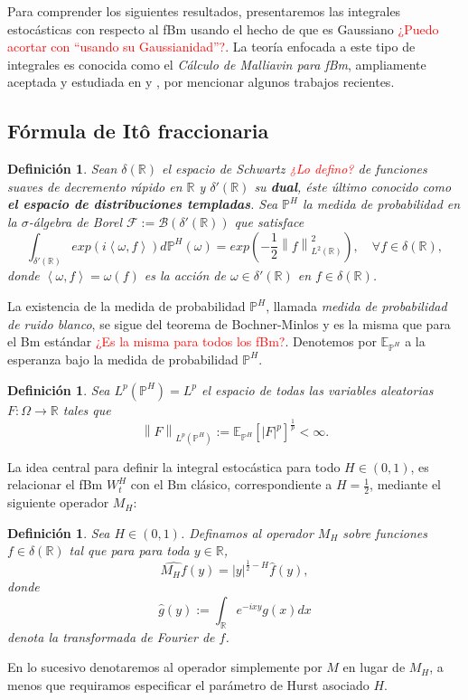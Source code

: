 \documentclass[letterpaper,12pt,oneside]{book}
\theoremstyle{plain}
\newtheorem{dfn}[theorem]{Definición}
\numberwithin{theorem}{section}
\begin{document}
Para comprender los siguientes resultados, presentaremos las integrales estocásticas con respecto al fBm usando el hecho de que es Gaussiano \textcolor{red}{¿Puedo acortar con ``usando su Gaussianidad''?}. La teoría enfocada a este tipo de integrales es conocida como el \textsl{Cálculo de Malliavin para fBm}, ampliamente aceptada y estudiada en \cite{yilmaz_computation_2018} y \cite{di_nunno_malliavin_2009}, por mencionar algunos trabajos recientes.
\subsection{Fórmula de Itô fraccionaria}
\begin{dfn}\label{dfn:1.3.1}
	Sean $\delta(\mathbb R)$ el espacio de Schwartz \textcolor{red}{¿Lo defino?} de funciones suaves de decremento rápido en $\mathbb R$ y $\delta'(\mathbb R)$ su \textbf{dual}, éste último conocido como \textbf{el espacio de distribuciones templadas}. Sea $\mathbb P^H$ la medida de probabilidad en la $\sigma$-álgebra de Borel $\mathcal F:=\mathcal B(\delta'(\mathbb R))$ que satisface
	$$\int_{\delta'(\mathbb R)}exp\left(i\left<\omega,f\right>\right)d\mathbb P^H(\omega)=exp\left(-\frac{1}{2}\left\|f\right\|^2_{L^2(\mathbb R)}\right),\quad \forall f\in\delta(\mathbb R),$$
	donde $\left<\omega,f\right>=\omega(f)$ es la acción de $\omega\in\delta'(\mathbb R)$ en $f\in \delta(\mathbb R)$.
\end{dfn}
La existencia de la medida de probabilidad $\mathbb P^H$, llamada \textsl{medida de probabilidad de ruido blanco}, se sigue del teorema de Bochner-Minlos y es la misma que para el Bm estándar \textcolor{red}{¿Es la misma para todos los fBm?}. Denotemos por $\mathbb E_{\mathbb P^H}$ a la esperanza bajo la medida de probabilidad $\mathbb P^H$.
\begin{dfn}
Sea $L^p(\mathbb P^H)=L^p$ el espacio de todas las variables aleatorias $F:\Omega\rightarrow \mathbb R$ tales que
$$\left\|F\right\|_{L^p(\mathbb P^H)}:=\mathbb E_{\mathbb P^H}\left[\left|F\right|^p\right]^{\frac{1}{p}}<\infty.$$
\end{dfn}
La idea central para definir la integral estocástica para todo $H\in(0,1)$, es relacionar el fBm $W^H_t$ con el Bm clásico, correspondiente a $H=\frac{1}{2}$, mediante el siguiente operador $M_H$:
\begin{dfn}
	Sea $H\in(0,1)$. Definamos al operador $M_H$ sobre funciones $f\in \delta(\mathbb R)$ tal que para para toda $y\in \mathbb R$,
	$$\widehat{M_Hf}(y)=|y|^{\frac{1}{2}-H}\widehat{f}(y),$$
	donde
	$$\widehat{g}(y):=\int_{\mathbb R}e^{-ixy}g(x)dx$$
	denota la transformada de Fourier de $f$.
\end{dfn}
En lo sucesivo denotaremos al operador simplemente por $M$ en lugar de $M_H$, a menos que requiramos especificar el parámetro de Hurst asociado $H$.
\end{document}
